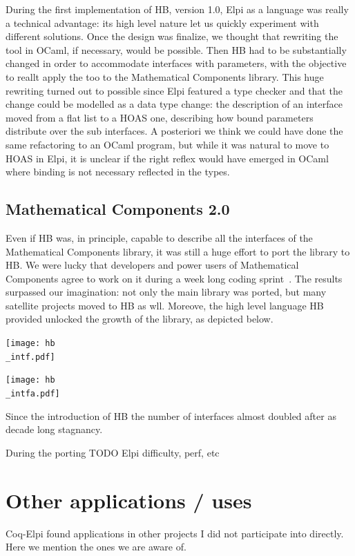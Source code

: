 \documentclass[a4paper, 11pt]{book}
\begin{document}
During the first implementation of HB, version 1.0, Elpi as a language was
really a technical advantage: its high level nature let us quickly experiment
with different solutions. Once the design was finalize, we thought that rewriting
the tool in OCaml, if necessary, would be possible. Then HB had to be substantially
changed in order to accommodate interfaces with parameters, with the objective
to reallt apply the too to the Mathematical Components library. This huge rewriting
turned out to possible since Elpi featured a type checker and that the change
could be modelled as a data type change: the description of an interface moved from
a flat list to a HOAS one, describing how bound parameters distribute over
the sub interfaces. A posteriori we think we could have done the same
refactoring to an OCaml program, but while it was natural to move to HOAS
in Elpi, it is unclear if the right reflex would have emerged in OCaml where
binding is not necessary reflected in the types.

\subsection{Mathematical Components 2.0}

Even if HB was, in principle, capable to describe all the interfaces of
the Mathematical Components library, it was still a huge effort to port the
library to HB.  We were lucky that developers and power users of
Mathematical Components agree to work on it during a week long coding
sprint~\cite{affeldt:hal-03463762}. The results surpassed our imagination:
not only the main library was ported, but many satellite projects moved to
HB as wll. Moreove, the high level language HB provided unlocked the
growth of the library, as depicted below. 

\texttt{[image: hb\\\_intf.pdf]}

\texttt{[image: hb\\\_intfa.pdf]}

Since the introduction of HB the number of interfaces almost doubled
after as decade long stagnancy.

During the porting TODO Elpi difficulty, perf, etc


\section{Other applications / uses}

Coq-Elpi found applications in other projects I did not participate
into directly. Here we mention the ones we are aware of.
\end{document}
